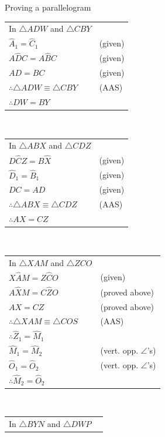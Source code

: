 \begin{wex}{Proving a parallelogram}
{} 
{
\begin{tabular}{ll}
In $\triangle ADW$ and $\triangle{CBY}$ & \\
$\hat{A}_{1} = \hat{C}_{1}$ & (given) \\
$A\hat{D}C = A\hat{B}C$ & (given) \\
$AD =BC$ & (given) \\ 
$\therefore \triangle ADW \equiv \triangle CBY$ & (AAS) \\
$\therefore DW = BY$ & \\
\end{tabular}\\ \newline
\begin{tabular}{ll}
In $\triangle ABX$ and $\triangle CDZ$ & \\
$D\hat{C}Z = B\hat{X}$ & (given) \\
$\hat{D}_{1} = \hat{B}_{1}$ & (given) \\
$DC = AD$ & (given) \\
$\therefore \triangle ABX \equiv \triangle CDZ$ & (AAS) \\ 
$\therefore AX = CZ$  & \\
\end{tabular}\\ \newline
\begin{tabular}{ll}
In $\triangle XAM$ and $\triangle ZCO$ & \\
$X\hat{A}M = Z\hat{C}O$ & (given) \\
$A\hat{X}M = C\hat{Z}O$ & (proved above) \\
$AX = CZ$ & (proved above) \\
$\therefore \triangle XAM \equiv \triangle COS$ & (AAS) \\
$\therefore \hat{Z}_{1} = \hat{M}_{1}$ & \\
$\hat{M}_1 = \hat{M}_2$ & (vert. opp. $\angle$'s) \\
$\hat{O}_{1} = \hat{O}_2$ & (vert. opp. $\angle$'s) \\
$\therefore \hat{M}_2 = \hat{O}_{2}$ & \\
\end{tabular}\\ \newline
\begin{tabular}{ll}
In $\triangle BYN$ and $\triangle DWP$ & \\

\end{tabular}}
\end{wex}
